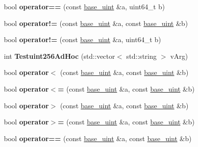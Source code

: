 \begin{DoxyCompactItemize}
bool {\bfseries operator==} (const \mbox{\hyperlink{classbase__uint}{base\+\_\+uint}} \&a, uint64\+\_\+t b)
\item 
\mbox{\label{classbase__uint_a3cc3bccf252004fbbd2b96dc769378e7}} 
bool {\bfseries operator!=} (const \mbox{\hyperlink{classbase__uint}{base\+\_\+uint}} \&a, const \mbox{\hyperlink{classbase__uint}{base\+\_\+uint}} \&b)
\item 
\mbox{\label{classbase__uint_ab7b366cc0883f25fa57fb09d4bc33807}} 
bool {\bfseries operator!=} (const \mbox{\hyperlink{classbase__uint}{base\+\_\+uint}} \&a, uint64\+\_\+t b)
\item 
\mbox{\label{classbase__uint_a4693ae47fe4f0b658eccfb36e6d51343}} 
int {\bfseries Testuint256\+Ad\+Hoc} (std\+::vector$<$ std\+::string $>$ v\+Arg)
\item 
\mbox{\label{classbase__uint_a89272b5112f90ba683c0f066ba1426c1}} 
bool {\bfseries operator$<$} (const \mbox{\hyperlink{classbase__uint}{base\+\_\+uint}} \&a, const \mbox{\hyperlink{classbase__uint}{base\+\_\+uint}} \&b)
\item 
\mbox{\label{classbase__uint_ac7f1bdba7208bd852f7b00f7c49624f8}} 
bool {\bfseries operator$<$=} (const \mbox{\hyperlink{classbase__uint}{base\+\_\+uint}} \&a, const \mbox{\hyperlink{classbase__uint}{base\+\_\+uint}} \&b)
\item 
\mbox{\label{classbase__uint_ac59719bd052d5dc2afcc35ae4a8843ab}} 
bool {\bfseries operator$>$} (const \mbox{\hyperlink{classbase__uint}{base\+\_\+uint}} \&a, const \mbox{\hyperlink{classbase__uint}{base\+\_\+uint}} \&b)
\item 
\mbox{\label{classbase__uint_a9eb243df5a6dfa3d0cd326427d99bfa6}} 
bool {\bfseries operator$>$=} (const \mbox{\hyperlink{classbase__uint}{base\+\_\+uint}} \&a, const \mbox{\hyperlink{classbase__uint}{base\+\_\+uint}} \&b)
\item 
\mbox{\label{classbase__uint_aafca305decdfd2ded4688213ab4a55fa}} 
bool {\bfseries operator==} (const \mbox{\hyperlink{classbase__uint}{base\+\_\+uint}} \&a, const \mbox{\hyperlink{classbase__uint}{base\+\_\+uint}} \&b)

\end{DoxyCompactItemize}
